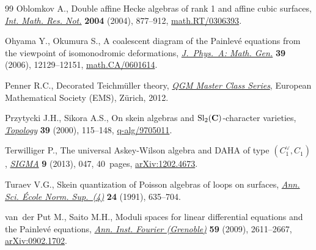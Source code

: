 \begin{thebibliography}{99}
Oblomkov A., Double affine {H}ecke algebras of rank 1 and affine cubic
 surfaces, \href{https://doi.org/10.1155/S1073792804133072}{\textit{Int. Math. Res. Not.}} \textbf{2004} (2004), 877--912,
 \href{https://arxiv.org/abs/math.RT/0306393}{math.RT/0306393}.

Ohyama Y., Okumura S., A coalescent diagram of the {P}ainlev\'{e} equations
 from the viewpoint of iso\-mo\-nodromic deformations, \href{https://doi.org/10.1088/0305-4470/39/39/S08}{\textit{J.~Phys.~A: Math.
 Gen.}} \textbf{39} (2006), 12129--12151, \href{https://arxiv.org/abs/math.CA/0601614}{math.CA/0601614}.

Penner R.C., Decorated {T}eichm\"{u}ller theory, \href{https://doi.org/10.4171/075}{\textit{QGM Master Class Series}},
 European Mathematical Society (EMS), Z\"{u}rich, 2012.

Przytycki J.H., Sikora A.S., On skein algebras and {${\rm Sl}_2({\bf
 C})$}-character varieties, \href{https://doi.org/10.1016/S0040-9383(98)00062-7}{\textit{Topology}} \textbf{39} (2000), 115--148,
 \href{https://arxiv.org/abs/q-alg/9705011}{q-alg/9705011}.

Terwilliger P., The universal {A}skey-{W}ilson algebra and {DAHA} of type
 {$(C^\vee_1,C_1)$}, \href{https://doi.org/10.3842/SIGMA.2013.047}{\textit{SIGMA}} \textbf{9} (2013), 047, 40~pages,
 \href{https://arxiv.org/abs/1202.4673}{arXiv:1202.4673}.

Turaev V.G., Skein quantization of {P}oisson algebras of loops on surfaces,
 \href{https://doi.org/10.24033/asens.1639}{\textit{Ann. Sci. \'{E}cole Norm. Sup.~(4)}} \textbf{24} (1991), 635--704.

van~der Put M., Saito M.H., Moduli spaces for linear differential equations and
 the {P}ainlev\'{e} equations, \href{https://doi.org/10.5802/aif.2502}{\textit{Ann. Inst. Fourier (Grenoble)}}
 \textbf{59} (2009), 2611--2667, \href{https://arxiv.org/abs/0902.1702}{arXiv:0902.1702}.

\end{thebibliography}
